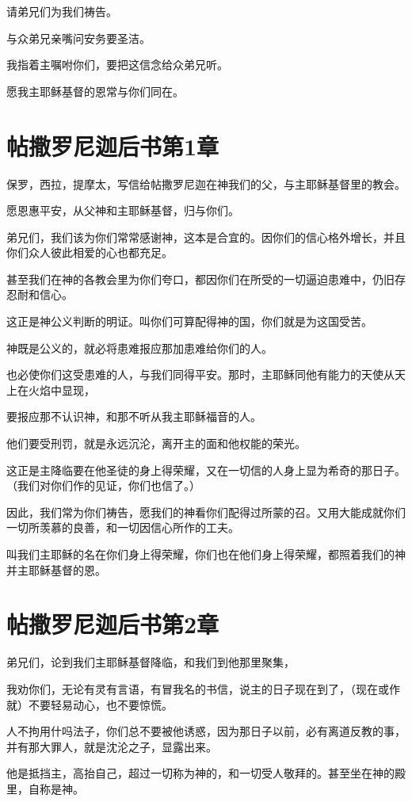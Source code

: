 \documentclass[12pt,oneside]{book}
\begin{document}
请弟兄们为我们祷告。

与众弟兄亲嘴问安务要圣洁。

我指着主嘱咐你们，要把这信念给众弟兄听。

愿我主耶稣基督的恩常与你们同在。

\chapter{帖撒罗尼迦后书第1章}
保罗，西拉，提摩太，写信给帖撒罗尼迦在神我们的父，与主耶稣基督里的教会。

愿恩惠平安，从父神和主耶稣基督，归与你们。

弟兄们，我们该为你们常常感谢神，这本是合宜的。因你们的信心格外增长，并且你们众人彼此相爱的心也都充足。

甚至我们在神的各教会里为你们夸口，都因你们在所受的一切逼迫患难中，仍旧存忍耐和信心。

这正是神公义判断的明证。叫你们可算配得神的国，你们就是为这国受苦。

神既是公义的，就必将患难报应那加患难给你们的人。

也必使你们这受患难的人，与我们同得平安。那时，主耶稣同他有能力的天使从天上在火焰中显现，

要报应那不认识神，和那不听从我主耶稣福音的人。

他们要受刑罚，就是永远沉沦，离开主的面和他权能的荣光。

这正是主降临要在他圣徒的身上得荣耀，又在一切信的人身上显为希奇的那日子。（我们对你们作的见证，你们也信了。）

因此，我们常为你们祷告，愿我们的神看你们配得过所蒙的召。又用大能成就你们一切所羡慕的良善，和一切因信心所作的工夫。

叫我们主耶稣的名在你们身上得荣耀，你们也在他们身上得荣耀，都照着我们的神并主耶稣基督的恩。

\chapter{帖撒罗尼迦后书第2章}
弟兄们，论到我们主耶稣基督降临，和我们到他那里聚集，

我劝你们，无论有灵有言语，有冒我名的书信，说主的日子现在到了，（现在或作就）不要轻易动心，也不要惊慌。

人不拘用什吗法子，你们总不要被他诱惑，因为那日子以前，必有离道反教的事，并有那大罪人，就是沈沦之子，显露出来。

他是抵挡主，高抬自己，超过一切称为神的，和一切受人敬拜的。甚至坐在神的殿里，自称是神。
\end{document}
